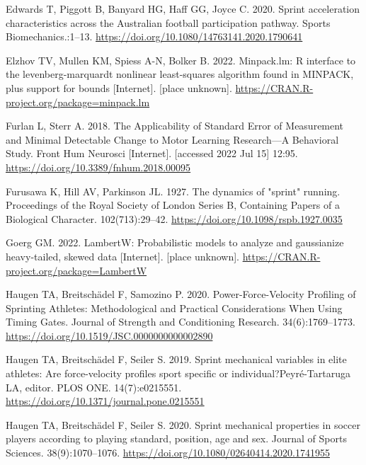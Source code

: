 \documentclass[
  letterpaper,
  DIV=11,
  numbers=noendperiod]{scrartcl}
\newlength{\cslhangindent}
\newlength{\cslentryspacingunit} %
\newenvironment{CSLReferences}[2] %
 {%
  \setlength{\parindent}{0pt}
  \ifodd #1
  \let\oldpar\par
  \def\par{\hangindent=\cslhangindent\oldpar}
  \fi
  \setlength{\parskip}{#2\cslentryspacingunit}
 }%
 {}
\begin{document}
\begin{CSLReferences}{0}{0}
\leavevmode{}%
Edwards T, Piggott B, Banyard HG, Haff GG, Joyce C. 2020. Sprint
acceleration characteristics across the {Australian} football
participation pathway. Sports Biomechanics.:1--13.
\url{https://doi.org/10.1080/14763141.2020.1790641}

\leavevmode{}%
Elzhov TV, Mullen KM, Spiess A-N, Bolker B. 2022. Minpack.lm: R
interface to the levenberg-marquardt nonlinear least-squares algorithm
found in MINPACK, plus support for bounds {[}Internet{]}. {[}place
unknown{]}. \url{https://CRAN.R-project.org/package=minpack.lm}

\leavevmode{}%
Furlan L, Sterr A. 2018. The {Applicability} of {Standard Error} of
{Measurement} and {Minimal Detectable Change} to {Motor Learning
Research}---{A Behavioral Study}. Front Hum Neurosci {[}Internet{]}.
{[}accessed 2022 Jul 15{]} 12:95.
\url{https://doi.org/10.3389/fnhum.2018.00095}

\leavevmode{}%
Furusawa K, Hill AV, Parkinson JL. 1927. The dynamics of "sprint"
running. Proceedings of the Royal Society of London Series B, Containing
Papers of a Biological Character. 102(713):29--42.
\url{https://doi.org/10.1098/rspb.1927.0035}

\leavevmode{}%
Goerg GM. 2022. LambertW: Probabilistic models to analyze and
gaussianize heavy-tailed, skewed data {[}Internet{]}. {[}place
unknown{]}. \url{https://CRAN.R-project.org/package=LambertW}

\leavevmode{}%
Haugen TA, Breitschädel F, Samozino P. 2020. Power-{Force}-{Velocity
Profiling} of {Sprinting Athletes}: {Methodological} and {Practical
Considerations When Using Timing Gates}. Journal of Strength and
Conditioning Research. 34(6):1769--1773.
\url{https://doi.org/10.1519/JSC.0000000000002890}

\leavevmode{}%
Haugen TA, Breitschädel F, Seiler S. 2019. Sprint mechanical variables
in elite athletes: {Are} force-velocity profiles sport specific or
individual?Peyré-Tartaruga LA, editor. PLOS ONE. 14(7):e0215551.
\url{https://doi.org/10.1371/journal.pone.0215551}

\leavevmode{}%
Haugen TA, Breitschädel F, Seiler S. 2020. Sprint mechanical properties
in soccer players according to playing standard, position, age and sex.
Journal of Sports Sciences. 38(9):1070--1076.
\url{https://doi.org/10.1080/02640414.2020.1741955}


\end{CSLReferences}
\end{document}
